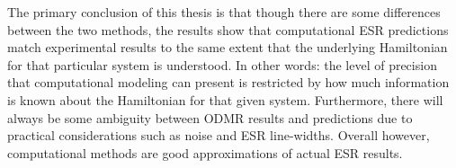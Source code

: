 \documentclass[oneside]{BYUPhys}
\begin{document}
The primary conclusion of this thesis is that though there are some differences between the two methods, the results show that computational ESR predictions match experimental results to the same extent that the underlying Hamiltonian for that particular system is understood. In other words: the level of precision that computational modeling can present is restricted by how much information is known about the Hamiltonian for that given system. Furthermore, there will always be some ambiguity between ODMR results and predictions due to practical considerations such as noise and ESR line-widths. Overall however, computational methods are good approximations of actual ESR results.
\end{document}
